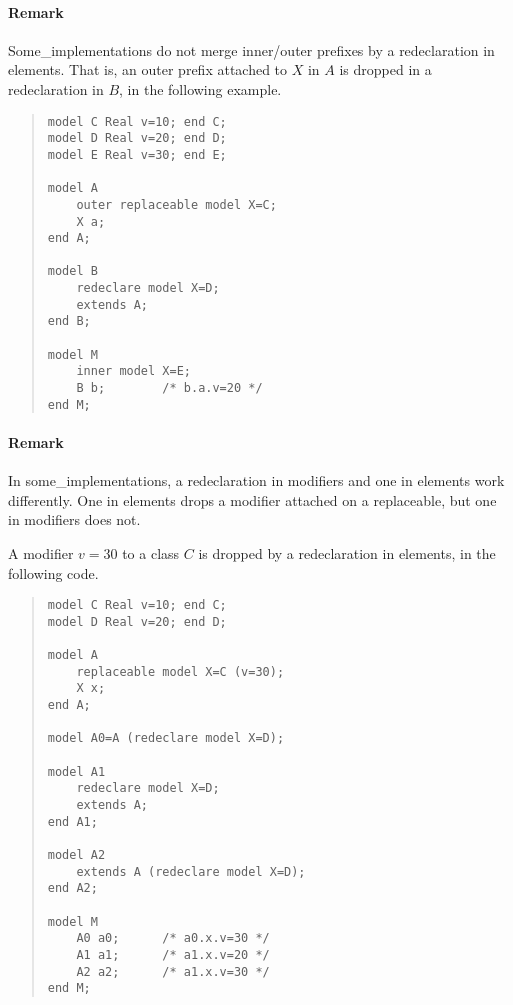 \documentclass[10pt,b5paper]{article}
\begin{document}
\paragraph {Remark}

Some_implementations do not merge inner/outer prefixes by a
redeclaration in elements.  That is, an outer prefix attached to $X$
in $A$ is dropped in a redeclaration in $B$, in the following example.
\begin{quote}
\begin{lstlisting}[aboveskip=-\baselineskip]
model C Real v=10; end C;
model D Real v=20; end D;
model E Real v=30; end E;

model A
    outer replaceable model X=C;
    X a;
end A;

model B
    redeclare model X=D;
    extends A;
end B;

model M
    inner model X=E;
    B b;        /* b.a.v=20 */
end M;
\end{lstlisting}
\end{quote}

\paragraph {Remark}

In some_implementations, a redeclaration in modifiers and one in
elements work differently.  One in elements drops a modifier attached
on a replaceable, but one in modifiers does not.

A modifier $v=30$ to a class $C$ is dropped by a redeclaration in
elements, in the following code.
\begin{quote}
\begin{lstlisting}[aboveskip=-\baselineskip]
model C Real v=10; end C;
model D Real v=20; end D;

model A
    replaceable model X=C (v=30);
    X x;
end A;

model A0=A (redeclare model X=D);

model A1
    redeclare model X=D;
    extends A;
end A1;

model A2
    extends A (redeclare model X=D);
end A2;

model M
    A0 a0;      /* a0.x.v=30 */
    A1 a1;      /* a1.x.v=20 */
    A2 a2;      /* a1.x.v=30 */
end M;
\end{lstlisting}
\end{quote}
\end{document}
